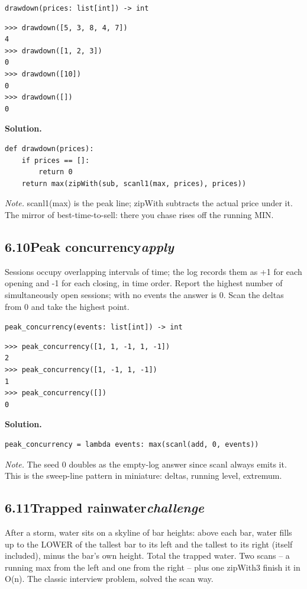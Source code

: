 \documentclass[10pt,letterpaper]{book}
\begin{document}
\noindent\texttt{drawdown(prices: list[int]) -> int}
\begin{lstlisting}[style=ex]
>>> drawdown([5, 3, 8, 4, 7])
4
>>> drawdown([1, 2, 3])
0
>>> drawdown([10])
0
>>> drawdown([])
0
\end{lstlisting}
\noindent\textbf{Solution.}
\begin{lstlisting}[style=code]
def drawdown(prices):
    if prices == []:
        return 0
    return max(zipWith(sub, scanl1(max, prices), prices))
\end{lstlisting}
\noindent\textit{Note.} scanl1(max) is the peak line; zipWith subtracts the actual price under it. The mirror of best-time-to-sell: there you chase rises off the running MIN.

\subsection*{6.10\quad Peak concurrency\hfill\textnormal{\textit{apply}}}
Sessions occupy overlapping intervals of time; the log records them as +1 for each opening and -1 for each closing, in time order. Report the highest number of simultaneously open sessions; with no events the answer is 0. Scan the deltas from 0 and take the highest point.

\noindent\texttt{peak\_concurrency(events: list[int]) -> int}
\begin{lstlisting}[style=ex]
>>> peak_concurrency([1, 1, -1, 1, -1])
2
>>> peak_concurrency([1, -1, 1, -1])
1
>>> peak_concurrency([])
0
\end{lstlisting}
\noindent\textbf{Solution.}
\begin{lstlisting}[style=code]
peak_concurrency = lambda events: max(scanl(add, 0, events))
\end{lstlisting}
\noindent\textit{Note.} The seed 0 doubles as the empty-log answer since scanl always emits it. This is the sweep-line pattern in miniature: deltas, running level, extremum.

\subsection*{6.11\quad Trapped rainwater\hfill\textnormal{\textit{challenge}}}
After a storm, water sits on a skyline of bar heights: above each bar, water fills up to the LOWER of the tallest bar to its left and the tallest to its right (itself included), minus the bar's own height. Total the trapped water. Two scans -- a running max from the left and one from the right -- plus one zipWith3 finish it in O(n). The classic interview problem, solved the scan way.
\end{document}
